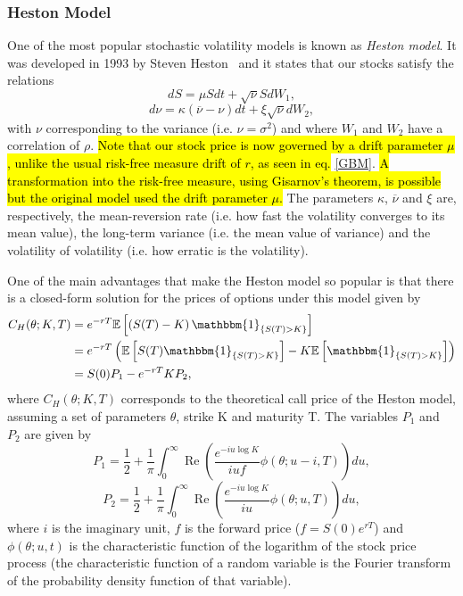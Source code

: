 \subsubsection{Heston Model}
One of the most popular stochastic volatility models is known as \emph{Heston model}. It was developed in 1993 by Steven Heston~\cite{Heston} and it states that our stocks satisfy the relations
\begin{equation}
dS=\mu Sdt+\sqrt{\nu}SdW_1,
\end{equation}
\begin{equation}
d\nu=\kappa(\overline{\nu}-\nu)dt+\xi\sqrt{\nu}dW_2,
\end{equation}
\noindent with $\nu$ corresponding to the variance (i.e. $\nu=\sigma^2$) and where $W_1$ and $W_2$ have a correlation of $\rho$. \hl{Note that our stock price is now governed by a drift parameter $\mu$, unlike the usual risk-free measure drift of $r$, as seen in eq.} \eqref{GBM}. \hl{A transformation into the risk-free measure, using Gisarnov's theorem, is possible but the original model used the drift parameter $\mu$.}
The parameters $\kappa$, $\overline{\nu}$ and $\xi$ are, respectively, the mean-reversion rate (i.e. how fast the volatility converges to its mean value), the long-term variance (i.e. the mean value of variance) and the volatility of volatility (i.e. how erratic is the volatility).

One of the main advantages that make the Heston model so popular is that there is a closed-form solution for the prices of options under this model given by
\begin{equation}\label{CH}
\begin{split}
C_{H}(\theta;K,T)&=e^{-rT}\mathbb{E}\left[\left(S(T)-K\right)\mathbbm{1}_{\left\{S(T)>K\right\}}\right]\\
&=e^{-rT}\left(\mathbb{E}\left[S(T)\mathbbm{1}_{\left\{S(T)>K\right\}}\right]-K\mathbb{E}\left[\mathbbm{1}_{\left\{S(T)>K\right\}}\right]\right)\\
&=S(0)P_1-e^{-rT}KP_2,
\end{split}
\end{equation}
\noindent where $C_{H}(\theta;K,T)$ corresponds to the theoretical call price of the Heston model, assuming a set of parameters $\theta$, strike K and maturity T. The variables $P_1$ and $P_2$ are given by
\begin{equation}\label{P1}
P_1=\frac{1}{2}+\frac{1}{\pi}\int_0^\infty\operatorname{Re}\left(\frac{e^{-iu\log K}}{iuf}\phi(\theta;u-i,T)\right)du,
\end{equation}
\begin{equation}\label{P2}
P_2=\frac{1}{2}+\frac{1}{\pi}\int_0^\infty\operatorname{Re}\left(\frac{e^{-iu\log K}}{iu}\phi(\theta;u,T)\right)du,
\end{equation}
\noindent where $i$ is the imaginary unit, $f$ is the forward price ($f=S(0)e^{rT}$) and $\phi(\theta;u,t)$ is the characteristic function of the logarithm of the stock price process (the characteristic function of a random variable is the Fourier transform of the probability density function of that variable).

